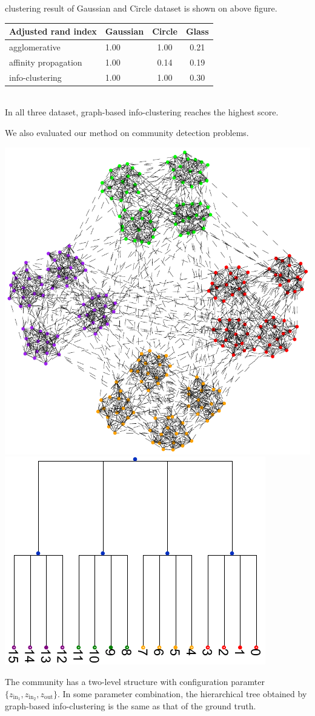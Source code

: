 \documentclass[portrait,final,a0paper,fontscale=0.3]{baposter}
\begin{document}
\begin{poster}
{\begin{multicols}{2}
clustering result of Gaussian and Circle dataset is shown on above figure.
\\

\begin{tabular}{lp{1.1cm}cc}
\hline
 Adjusted rand index   &   Gaussian &   Circle &   Glass \\
\hline
 agglomerative         &       1.00 &     1.00 &    0.21 \\
 affinity propagation  &       1.00 &     0.14 &    0.19 \\
 info-clustering       &       1.00 &     1.00 &    0.30 \\
\hline
\end{tabular}
\\

In all three dataset, graph-based info-clustering reaches the highest score.

We also evaluated our method on community detection problems. 

{
\includegraphics[width=0.4\linewidth]{img/two_level.pdf}
\includegraphics[width=0.46\linewidth]{img/tree_info-clustering.pdf} 
}

The community has a two-level structure with configuration paramter $\{z_{\mathrm{in}_1}, z_{\mathrm{in}_2}, z_{\mathrm{out}} \}$.
In some parameter combination, the hierarchical tree obtained by graph-based info-clustering is the same as that of the ground truth.\\


\end{multicols}}
\end{poster}
\end{document}
